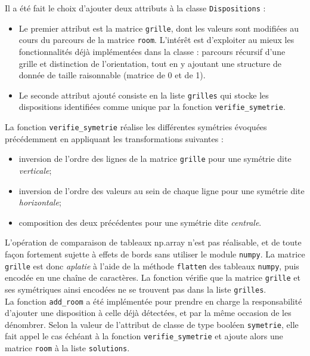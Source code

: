 \begin{multicols}{2}
\end{multicols}

Il a été fait le choix d'ajouter deux attributs à la classe \texttt{Dispositions} :
\begin{itemize}
    \item Le premier attribut est la matrice \texttt{grille}, dont les valeurs sont modifiées au cours du 
    parcours de la matrice \texttt{room}. L'intérêt est d'exploiter au mieux les fonctionnalités déjà implémentées 
    dans la classe : parcours récursif d'une grille et distinction de l'orientation, tout en y ajoutant une 
    structure de donnée de taille raisonnable (matrice de 0 et de 1).
    \item Le seconde attribut ajouté consiste en la liste \texttt{grilles} qui stocke les dispositions
    identifiées comme unique par la fonction \texttt{verifie\_symetrie}.
\end{itemize} 

La fonction \texttt{verifie\_symetrie} réalise les différentes symétries évoquées précédemment en appliquant
les transformations suivantes :
\begin{itemize}
    \item inversion de l'ordre des lignes de la matrice \texttt{grille} pour une symétrie dite \emph{verticale};
    \item inversion de l'ordre des valeurs au sein de chaque ligne pour une symétrie dite \emph{horizontale};
    \item composition des deux précédentes pour une symétrie dite \emph{centrale}.
\end{itemize}
L'opération de comparaison de tableaux np.array n'est pas réalisable, et de toute façon fortement sujette
à effets de bords sans utiliser le module \texttt{numpy}. La matrice \texttt{grille} est donc \emph{aplatie} à
l'aide de la méthode \texttt{flatten} des tableaux \texttt{numpy}, puis encodée en une chaîne de caractères.
La fonction vérifie que la matrice \texttt{grille} et ses symétriques ainsi encodées ne se trouvent pas dans 
la liste \texttt{grilles}.\\

La fonction \texttt{add\_room} a été implémentée pour prendre en charge la responsabilité d'ajouter une disposition
à celle déjà détectées, et par la même occasion de les dénombrer. Selon la valeur de l'attribut de classe de type booléen
\texttt{symetrie}, elle fait appel le cas échéant à la fonction \texttt{verifie\_symetrie} et ajoute alors une matrice
\texttt{room} à la liste \texttt{solutions}.











